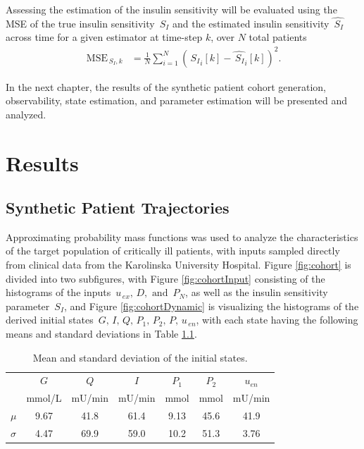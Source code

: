 \documentclass[nomenclature, english, bibtex]{kththesis}
\begin{document}
Assessing the estimation of the insulin sensitivity will be evaluated using the \gls{MSE} of the true insulin sensitivity $\,S_I$ and the estimated insulin sensitivity $\hat{\,S_I}$ across time for a given estimator at time-step $k$, over $N$ total patients
\begin{equation}
\begin{aligned}
\,\text{MSE}_{\,S_I, k} &= \frac{1}{N} \sum_{i=1}^{N} \left({\,S_I}_i[k] - \hat{\,S_I}_i[k]\right)^2.
\end{aligned}
\end{equation}

In the next chapter, the results of the synthetic patient cohort generation, observability, state estimation, and parameter estimation will be presented and analyzed.
\cleardoublepage
\chapter{Results}
\label{ch:resultsAndAnalysis}

\section{Synthetic Patient Trajectories} \label{sec:cohortResults}
Approximating probability mass functions was used to analyze the characteristics of the target population of critically ill patients, with inputs sampled directly from clinical data from the Karolinska University Hospital. Figure \ref{fig:cohort} is divided into two subfigures, with Figure \ref{fig:cohortInput} consisting of the histograms of the inputs $\,u_{\,ex},\,D,\text{ and }\,P_N$, as well as the insulin sensitivity parameter $\,S_I$, and Figure \ref{fig:cohortDynamic} is visualizing the histograms of the derived initial states $\,G,\,I,\,Q,\,P_1,\,P_2,\,P,\,u_{\,en}$, with each state having the following means and standard deviations in Table \ref{tab:initstates}.
\begin{table}[ht!]
    \centering
    \caption{Mean and standard deviation of the initial states.}
    \label{tab:initstates}
    \begin{tabular}{l c c c c c c}
        \toprule
        & {$G$} & {$Q$} & {$I$} & {$P_1$} & {$P_2$} & {$u_{en}$} \\
        & \scriptsize mmol/L & \scriptsize mU/min & \scriptsize mU/min & \scriptsize mmol & \scriptsize mmol & \scriptsize mU/min \\
        \midrule
        $\mu$  & 9.67 & 41.8 & 61.4 & 9.13 & 45.6 & 41.9 \\
        $\sigma$ & 4.47 & 69.9 & 59.0 & 10.2 & 51.3 & 3.76 \\
        \bottomrule
    \end{tabular}
\end{table}
\end{document}
